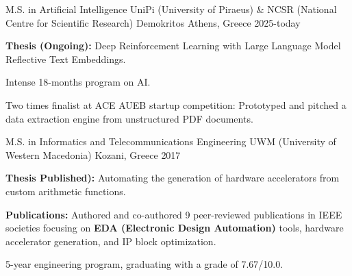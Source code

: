 
\begin{cventries}

\cventry
    {M.S. in Artificial Intelligence} %
    {UniPi (University of Piraeus) \& NCSR (National Centre for Scientific Research) Demokritos} %
    {Athens, Greece} %
    {2025-today} %
{
\begin{cvitems}
\item {\textbf{Thesis (Ongoing):} Deep Reinforcement Learning with Large Language Model Reflective Text Embeddings.}
\item {Intense 18-months program on AI.}
\item {Two times finalist at ACE AUEB startup competition: Prototyped and pitched a data extraction engine from unstructured PDF documents.}
\end{cvitems}
}

\cventry
{M.S. in Informatics and Telecommunications Engineering} %
{UWM (University of Western Macedonia)} %
{Kozani, Greece} %
{2017} %
{
\begin{cvitems}
\item {\textbf{Thesis {Published)}:} Automating the generation of hardware accelerators from custom arithmetic functions.}
\item {\textbf{Publications:} Authored and co-authored 9 peer-reviewed publications in IEEE societies focusing on \textbf{EDA (Electronic Design Automation)} tools, hardware accelerator generation, and IP block optimization.}
\item {5-year engineering program, graduating with a grade of 7.67/10.0.}
\end{cvitems}
}

\end{cventries}
